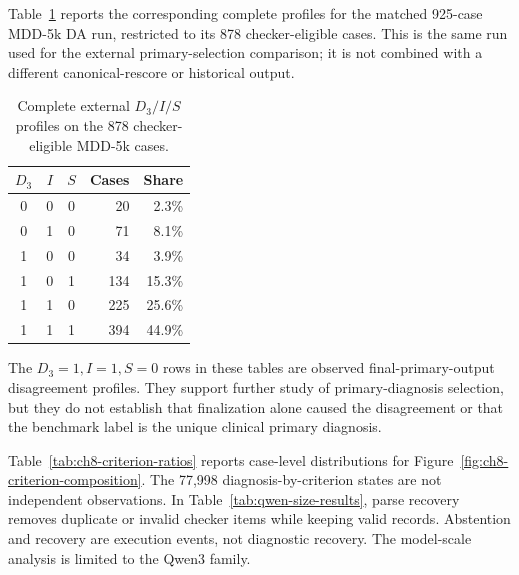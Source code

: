 \documentclass[12pt,a4paper,oneside]{report}
\begin{document}
Table~\ref{tab:external-six-profiles} reports the corresponding complete
profiles for the matched 925-case MDD-5k DA run, restricted to its 878
checker-eligible cases. This is the same run used for the external
primary-selection comparison; it is not combined with a different
canonical-rescore or historical output.

\begin{table}[htbp]
\centering
\caption{Complete external $D_3/I/S$ profiles on the 878 checker-eligible MDD-5k cases.}
\label{tab:external-six-profiles}
\small
\begin{tabular}{|c|c|c|r|r|}
\hline
$D_3$ & $I$ & $S$ & Cases & Share\\
\hline
0 & 0 & 0 & 20 & 2.3\%\\
\hline
0 & 1 & 0 & 71 & 8.1\%\\
\hline
1 & 0 & 0 & 34 & 3.9\%\\
\hline
1 & 0 & 1 & 134 & 15.3\%\\
\hline
1 & 1 & 0 & 225 & 25.6\%\\
\hline
1 & 1 & 1 & 394 & 44.9\%\\
\hline
\end{tabular}
\end{table}

The $D_3=1,I=1,S=0$ rows in these tables are observed
final-primary-output disagreement profiles. They support further study of
primary-diagnosis selection, but they do not establish that finalization
alone caused the disagreement or that the benchmark label is the unique
clinical primary diagnosis.

Table~\ref{tab:ch8-criterion-ratios} reports case-level distributions for Figure~\ref{fig:ch8-criterion-composition}. The 77,998 diagnosis-by-criterion states are not independent observations. In Table~\ref{tab:qwen-size-results}, parse recovery removes duplicate or invalid checker items while keeping valid records. Abstention and recovery are execution events, not diagnostic recovery. The model-scale analysis is limited to the Qwen3 family.
\end{document}

